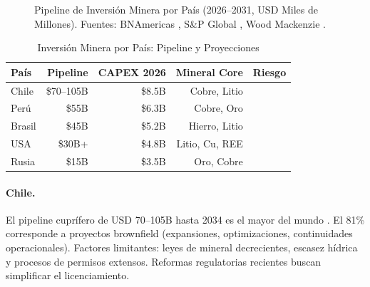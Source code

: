 \begin{figure}[htbp]
\centering
{}
\caption{Pipeline de Inversión Minera por País (2026--2031, USD Miles de Millones). Fuentes: BNAmericas \cite{bnamericas2026}, S\&P Global \cite{spglobal2026}, Wood Mackenzie \cite{woodmac2026}.}
\label{fig:regional_capex}
\end{figure}

\begin{table}[htbp]
\centering
\caption{Inversión Minera por País: Pipeline y Proyecciones}
\begin{tabular}{@{}lrrrr@{}}
\toprule
\textbf{País} & \textbf{Pipeline} & \textbf{CAPEX 2026} & \textbf{Mineral Core} & \textbf{Riesgo} \\
\midrule
Chile & \$70--105B & \$8.5B & Cobre, Litio & \risklow{} \\
\rowcolor{tablealt} Perú & \$55B & \$6.3B & Cobre, Oro & \riskmedium{} \\
Brasil & \$45B & \$5.2B & Hierro, Litio & \risklow{} \\
\rowcolor{tablealt} USA & \$30B+ & \$4.8B & Litio, Cu, REE & \risklow{} \\
Rusia & \$15B & \$3.5B & Oro, Cobre & \riskhigh{} \\
\bottomrule
\end{tabular}
\label{tab:regional_capex}
\end{table}

\paragraph{Chile.} El pipeline cuprífero de USD 70--105B hasta 2034 es el mayor del mundo \cite{cochilco2026}. El 81\% corresponde a proyectos brownfield (expansiones, optimizaciones, continuidades operacionales). Factores limitantes: leyes de mineral decrecientes, escasez hídrica y procesos de permisos extensos. Reformas regulatorias recientes buscan simplificar el licenciamiento.

